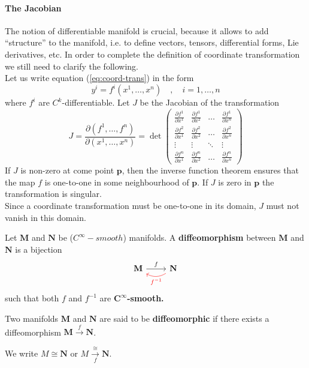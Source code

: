 \documentclass[../main.tex]{subfiles}
\begin{document}
\paragraph{The Jacobian \cite{ferrari2020general}}
The notion of differentiable manifold is crucial, because it allows to add “structure” to
the manifold, i.e. to define vectors, tensors, differential forms, Lie derivatives, etc. In order
to complete the definition of coordinate transformation we still need to clarify the following.\\
Let us write equation (\ref{eq:coord-trans}) in the form \[
y^i=f^i(x^1,\dots,x^n) \quad,\quad i=1,\dots,n
\]
where $f^i$ are $C^k$-differentiable. Let $J$ be the Jacobian of the transformation 
\[
J=\frac{\partial(f^1,\dots,f^n)}{\partial(x^1,\dots,x^n)}=\det
\begin{pmatrix}
\frac{\partial f^1}{\partial x^1} & \frac{\partial f^1}{\partial x^2} & \dots & \frac{\partial f^1}{\partial x^n}\\
\frac{\partial f^2}{\partial x^1} & \frac{\partial f^2}{\partial x^2} & \dots & \frac{\partial f^2}{\partial x^n}\\
\vdots & \vdots & \ddots & \vdots\\
\frac{\partial f^n}{\partial x^1} & \frac{\partial f^n}{\partial x^2} & \dots & \frac{\partial f^n}{\partial x^n}
\end{pmatrix}
\]
If $J$ is non-zero at come point $\mathbf{p}$, then the inverse function theorem ensures that the map $f$ is one-to-one in some neighbourhood of $\mathbf{p}$. If $J$ is zero in $\mathbf{p}$ the transformation is singular.\\
Since a coordinate transformation must be one-to-one in its domain, $J$ must not vanish in this domain.
\begin{definition}
Let $\mathbf{M}$ and $\mathbf{N}$ be ($C^\infty-smooth$) manifolds. A \textbf{diffeomorphism} between $\mathbf{M}$ and $\mathbf{N}$ is a bijection
\[
\begin{tikzcd}
\mathbf{M}\rar{f} & \arrow[red, bend left]{l}[black,swap,below]{\color{red}f^{-1}} \mathbf{N}
\end{tikzcd}
\]
such that both $f$ and $f^{-1}$ are $\mathbf{C}^\infty$\textbf{-smooth.}
\end{definition}
\begin{definition}[Diffeomorphic]
Two manifolds $\mathbf{M}$ and $\mathbf{N}$ are said to be \textbf{diffeomorphic} if there exists a diffeomorphism \(\mathbf{M}\xrightarrow{f}\mathbf{N}\).
\end{definition}
\begin{kaobox}[frametitle=Notation]
We write \(M\cong \mathbf{N}\) or \(M\xrightarrow[f]{\cong}\mathbf{N}\).
\end{kaobox}
\end{document}
